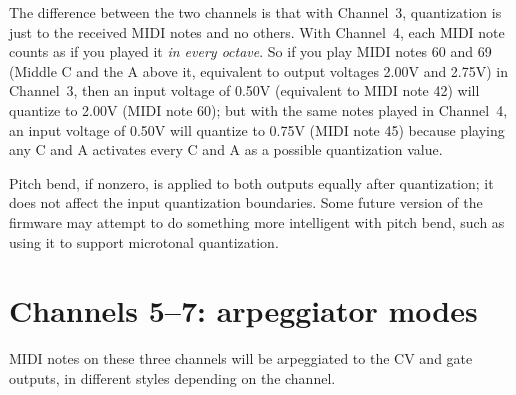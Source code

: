 The difference between the two channels is that with Channel~3, quantization
is just to the received MIDI notes and no others.  With Channel~4, each
MIDI note counts as if you played it \emph{in every octave}.  So if you
play MIDI notes 60 and 69 (Middle C and the A above it, equivalent to output
voltages 2.00V and 2.75V) in Channel~3, then an input voltage of 0.50V
(equivalent to MIDI note 42) will quantize to 2.00V (MIDI note 60); but with
the same notes played in Channel~4, an input voltage of 0.50V will quantize
to 0.75V (MIDI note 45) because playing any C and A activates every C and A
as a possible quantization value.

Pitch bend, if nonzero, is applied to both outputs equally after
quantization; it does not affect the input quantization boundaries.  Some
future version of the firmware may attempt to do something more intelligent
with pitch bend, such as using it to support microtonal quantization.


\section{Channels 5--7:  arpeggiator modes}

MIDI notes on these three channels will be arpeggiated to the CV and gate
outputs, in different styles depending on the channel.

{\centering
{}\par}


